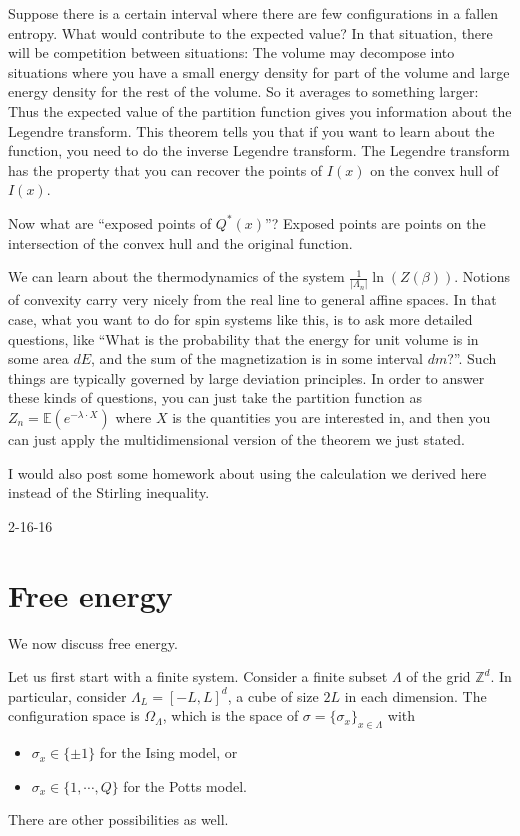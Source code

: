 \documentclass[12pt]{book}
\theoremstyle{norm}
\begin{document}
Suppose there is a certain interval where there are few configurations in a fallen entropy. What would contribute to the expected value? In that situation, there will be competition between situations: The volume may decompose into situations where you have a small energy density for part of the volume and large energy density for the rest of the volume. So it averages to something larger: Thus the expected value of the partition function gives you information about the Legendre transform. This theorem tells you that if you want to learn about the function, you need to do the inverse Legendre transform. The Legendre transform has the property that you can recover the points of $I(x)$ on the convex hull of $I(x)$. 

Now what are ``exposed points of $Q^*(x)$''? Exposed points are points on the intersection of the convex hull and the original function. 

We can learn about the thermodynamics of the system $\frac{1}{|\Lambda_n|}\ln(Z(\beta))$. Notions of convexity carry very nicely from the real line to general affine spaces. In that case, what you want to do for spin systems like this, is to ask more detailed questions, like ``What is the probability that the energy for unit volume is in some area $dE$, and the sum of the magnetization is in some interval $dm$?''. Such things are typically governed by large deviation principles. 
In order to answer these kinds of questions, you can just take the partition function as $Z_n = \mathbb{E}(e^{-\lambda \cdot X})$ where $X$ is the quantities you are interested in, and then you can just apply the multidimensional version of the theorem we just stated. 

{\color{blue}I would also post some homework about using the calculation we derived here instead of the Stirling inequality. }





{\color{blue}2-16-16}

\section{Free energy}

We now discuss free energy. 

Let us first start with a finite system. Consider a finite subset $\Lambda$ of the grid $\mathbb{Z}^d$. In particular, consider $\Lambda_L = [-L, L]^d$, a cube of size $2L$ in each dimension. The configuration space is $\Omega_{\Lambda}$, which is the space of $\sigma=\{\sigma_x\}_{x \in \Lambda}$ with 
\begin{itemize}
\item
$\sigma_x \in \{\pm 1\}$ for the Ising model, or 
\item $\sigma_x\in \{1, \cdots, Q\}$ for the Potts model. 
\end{itemize}
There are other possibilities as well. 
\end{document}
